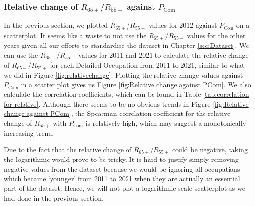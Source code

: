 \documentclass[11pt]{article}
\begin{document}
\subsubsection*{Relative change of $R_{65+}$/$R_{55+}$ against $P_{\text{Com}}$}
In the previous section, we plotted $R_{65+}$/$R_{55+}$ values for 2012 against $P_{\text{Com}}$ on a scatterplot. It seems like a waste to not use the $R_{65+}$/$R_{55+}$ values for the other years given all our efforts to standardise the dataset in Chapter \ref{sec:Dataset}. We can use the $R_{65+}$/$R_{55+}$ values for 2011 and 2021 to calculate the relative change of $R_{65+}$/$R_{55+}$ for each Detailed Occupation from 2011 to 2021, similar to what we did in Figure \ref{fig:relativechange}. Plotting the relative change values against $P_{\text{Com}}$ in a scatter plot gives us Figure \ref{fig:Relative change against PCom}. We also calculate the correlation coefficients, which can be found in Table \ref{tab:correlation for relative}. Although there seems to be no obvious trends in Figure \ref{fig:Relative change against PCom}, the Spearman correlation coefficient for the relative change of $R_{55+}$ with $P_{\text{Com}}$ is relatively high, which may suggest a monotonically increasing trend.

Due to the fact that the relative change of $R_{65+}$/$R_{55+}$ could be negative, taking the logarithmic would prove to be tricky. It is hard to justify simply removing negative values from the dataset because we would be ignoring all occupations which became `younger' from 2011 to 2021 when they are actually an essential part of the dataset. Hence, we will not plot a logarithmic scale scatterplot as we had done in the previous section.
\end{document}
